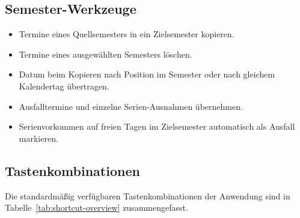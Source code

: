 \documentclass[12pt,a4paper]{article}
\begin{document}
\subsection{Semester-Werkzeuge}

\begin{itemize}
\item Termine eines Quellsemesters in ein Zielsemester kopieren.
\item Termine eines ausgewählten Semesters löschen.
\item Datum beim Kopieren nach Position im Semester oder nach gleichem Kalendertag übertragen.
\item Ausfalltermine und einzelne Serien-Ausnahmen übernehmen.
\item Serienvorkommen auf freien Tagen im Zielsemester automatisch als Ausfall markieren.
\end{itemize}

\subsection{Tastenkombinationen}

Die standardmäßig verfügbaren Tastenkombinationen der Anwendung sind in Tabelle~\ref{tab:shortcut-overview} zusammengefasst.
\end{document}

